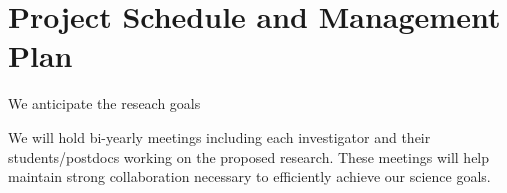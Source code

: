 \section{Project Schedule and Management Plan}

We anticipate the reseach goals 

We will  hold bi-yearly meetings including each investigator and their students/postdocs working on the proposed research. These meetings will help maintain strong collaboration necessary to efficiently achieve our science goals.
